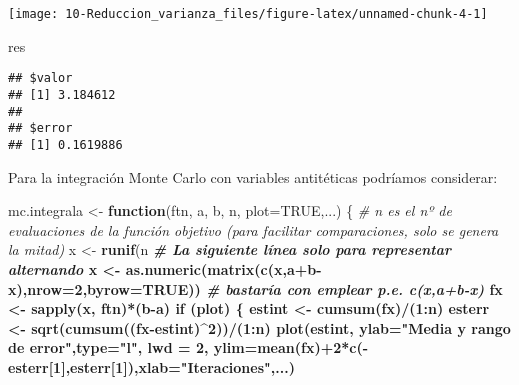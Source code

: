 \documentclass[
]{book}
\newenvironment{Shaded}{\begin{snugshade}}{\end{snugshade}}
\newcommand{\CommentTok}[1]{\textcolor[rgb]{0.56,0.35,0.01}{\textit{#1}}}
\newcommand{\ControlFlowTok}[1]{\textcolor[rgb]{0.13,0.29,0.53}{\textbf{#1}}}
\newcommand{\DataTypeTok}[1]{\textcolor[rgb]{0.13,0.29,0.53}{#1}}
\newcommand{\DecValTok}[1]{\textcolor[rgb]{0.00,0.00,0.81}{#1}}
\newcommand{\KeywordTok}[1]{\textcolor[rgb]{0.13,0.29,0.53}{\textbf{#1}}}
\newcommand{\NormalTok}[1]{#1}
\newcommand{\OperatorTok}[1]{\textcolor[rgb]{0.81,0.36,0.00}{\textbf{#1}}}
\newcommand{\OtherTok}[1]{\textcolor[rgb]{0.56,0.35,0.01}{#1}}
\newcommand{\StringTok}[1]{\textcolor[rgb]{0.31,0.60,0.02}{#1}}
\theoremstyle{break}
\theoremstyle{definition}
\theoremstyle{definition}
\theoremstyle{definition}
\theoremstyle{remark}
\begin{document}
\begin{center}\texttt{[image: 10-Reduccion\_varianza\_files/figure-latex/unnamed-chunk-4-1]} \end{center}

\begin{Shaded}
\begin{Highlighting}[]
\NormalTok{res}
\end{Highlighting}
\end{Shaded}

\begin{verbatim}
## $valor
## [1] 3.184612
## 
## $error
## [1] 0.1619886
\end{verbatim}

Para la integración Monte Carlo con variables antitéticas podríamos considerar:

\begin{Shaded}
\begin{Highlighting}[]
\NormalTok{mc.integrala <-}\StringTok{ }\ControlFlowTok{function}\NormalTok{(ftn, a, b, n, }\DataTypeTok{plot=}\OtherTok{TRUE}\NormalTok{,...) \{}
  \CommentTok{# n es el nº de evaluaciones de la función objetivo (para facilitar comparaciones, solo se genera la mitad)}
\NormalTok{  x <-}\StringTok{ }\KeywordTok{runif}\NormalTok{(n}\OperatorTok{%/%}\DecValTok{2}\NormalTok{, a, b)}
  \CommentTok{# La siguiente línea solo para representar alternando}
\NormalTok{  x <-}\StringTok{ }\KeywordTok{as.numeric}\NormalTok{(}\KeywordTok{matrix}\NormalTok{(}\KeywordTok{c}\NormalTok{(x,a}\OperatorTok{+}\NormalTok{b}\OperatorTok{-}\NormalTok{x),}\DataTypeTok{nrow=}\DecValTok{2}\NormalTok{,}\DataTypeTok{byrow=}\OtherTok{TRUE}\NormalTok{))}
  \CommentTok{# bastaría con emplear p.e. c(x,a+b-x)}
\NormalTok{  fx <-}\StringTok{ }\KeywordTok{sapply}\NormalTok{(x, ftn)}\OperatorTok{*}\NormalTok{(b}\OperatorTok{-}\NormalTok{a)}
  \ControlFlowTok{if}\NormalTok{ (plot) \{}
\NormalTok{    estint <-}\StringTok{ }\KeywordTok{cumsum}\NormalTok{(fx)}\OperatorTok{/}\NormalTok{(}\DecValTok{1}\OperatorTok{:}\NormalTok{n)}
\NormalTok{    esterr <-}\StringTok{ }\KeywordTok{sqrt}\NormalTok{(}\KeywordTok{cumsum}\NormalTok{((fx}\OperatorTok{-}\NormalTok{estint)}\OperatorTok{^}\DecValTok{2}\NormalTok{))}\OperatorTok{/}\NormalTok{(}\DecValTok{1}\OperatorTok{:}\NormalTok{n)}
    \KeywordTok{plot}\NormalTok{(estint, }\DataTypeTok{ylab=}\StringTok{"Media y rango de error"}\NormalTok{,}\DataTypeTok{type=}\StringTok{"l"}\NormalTok{, }\DataTypeTok{lwd =} \DecValTok{2}\NormalTok{,}
         \DataTypeTok{ylim=}\KeywordTok{mean}\NormalTok{(fx)}\OperatorTok{+}\DecValTok{2}\OperatorTok{*}\KeywordTok{c}\NormalTok{(}\OperatorTok{-}\NormalTok{esterr[}\DecValTok{1}\NormalTok{],esterr[}\DecValTok{1}\NormalTok{]),}\DataTypeTok{xlab=}\StringTok{"Iteraciones"}\NormalTok{,...)}
}
\end{Highlighting}
\end{Shaded}
\end{document}
